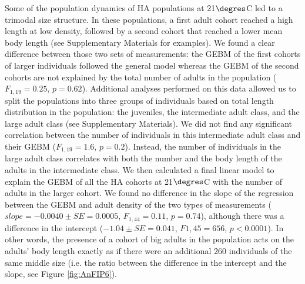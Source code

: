 Some of the population dynamics of HA populations at 21$\degres$C led to a
trimodal size structure. In these populations, a first adult cohort reached a high length at
low density, followed by a second cohort that reached a lower mean body length
(see Supplementary Materials for examples). We found a
clear difference between those two sets of measurements: the GEBM of the first cohorts of larger
individuals followed the general model whereas the GEBM of the second cohorts
are not explained by the total number of adults in the population
($F_{1,19}=0.25$, $p=0.62$). Additional analyses performed on this data allowed
us to split the populations into three groups of individuals based on total length distribution
in the population: the juveniles, the intermediate adult class, and the large
adult class (see Supplementary Materials). We did not find any significant
correlation between the number of individuals in this intermediate adult class and their
GEBM ($F_{1,19} = 1.6$, $p = 0.2$). Instead, the number of
individuals in the large adult class correlates with both the number and the body length of the
adults in the intermediate class. We then calculated a final linear model to
explain the GEBM of all the HA cohorts at 21$\degres$C with the number of adults
in the larger cohort. We found no difference in the slope of the regression between the
GEBM and adult density of the two types of measurements ($slope = -0.0040 \pm SE
= 0.0005$, $F_{1,44} = 0.11$, $p = 0.74$), although there was a difference in
the intercept ($-1.04 \pm SE = 0.041$, $F1,45 = 656$, $p < 0.0001$). In other
words, the presence of a cohort of big adults in the population acts on the adults’ body
length exactly as if there were an additional 260 individuals of the same middle
size (i.e. the ratio between the difference in the intercept and the slope, see
Figure \ref{fig:AnFIP6}).

